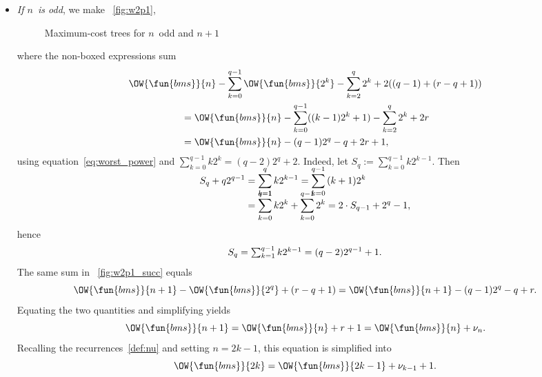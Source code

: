 \begin{itemize}
  \item \emph{If \(n\)~is odd}, we make
    \fig~\vref{fig:w2p1},
\begin{figure}[t]
\centering
{}
\qquad
{}
\caption{Maximum-cost trees for \(n\)~odd and \(n+1\)}
\label{fig:Wn_odd}
\end{figure}
    where the non\hyp{}boxed expressions sum
    \begin{multline*}
      \OW{\fun{bms}}{n} - \sum_{k=0}^{q-1}\OW{\fun{bms}}{2^k} -
      \sum_{k=2}^{q}2^k + 2((q-1)+(r-q+1))\\
      \begin{aligned}
        & = \OW{\fun{bms}}{n} - \sum_{k=0}^{q-1}((k-1)2^{k}+1)
        - \sum_{k=2}^{q}2^k + 2r\\
        & = \OW{\fun{bms}}{n} - (q-1)2^q - q + 2r + 1,
      \end{aligned}
    \end{multline*}
    using equation~\eqref{eq:worst_power} and \(\sum_{k=0}^{q-1}k2^k =
    (q-2)2^{q}+2\). Indeed, let \(S_{q} :=
    \sum_{k=0}^{q-1}{k2^{k-1}}\). Then
    \begin{align*}
      S_{q} + q2^{q-1} & = \smash[t]{\sum_{k=1}^{q}{k2^{k-1}}}
      = \smash[t]{\sum_{k=0}^{q-1}{(k+1)2^{k}}} \\
      & = \smash[t]{\sum_{k=0}^{q-1}{k2^{k}}} + \smash[t]{\sum_{k=0}^{q-1}{2^{k}}}
      = 2 \cdot S_{q-1} + 2^{q} - 1,
    \end{align*}
    hence
    \begin{equation}
      S_{q} = \smash[t]{\textstyle\sum_{k=1}^{q-1}{k2^{k-1}}} =
      (q-2)2^{q-1} + 1.
      \label{eq:Sj}
    \end{equation}
    The same sum in \fig~\ref{fig:w2p1_succ}
    equals
    \begin{equation*}
      \OW{\fun{bms}}{n+1} - \OW{\fun{bms}}{2^q} + (r-q+1) =
      \OW{\fun{bms}}{n+1} - (q-1)2^{q} - q + r.
    \end{equation*}
    Equating the two quantities and simplifying yields
    \begin{equation*}
      \OW{\fun{bms}}{n+1} = \OW{\fun{bms}}{n} + r + 1=
      \OW{\fun{bms}}{n} + \nu_n.
    \end{equation*}
    Recalling the recurrences~\eqref{def:nu}  and
    setting \(n=2k-1\), this equation is simplified into
    \begin{equation}
      \OW{\fun{bms}}{2k} = \OW{\fun{bms}}{2k-1} + \nu_{k-1} + 1.
      \label{eq:OWbms_2k}
    \end{equation}

\end{itemize}

